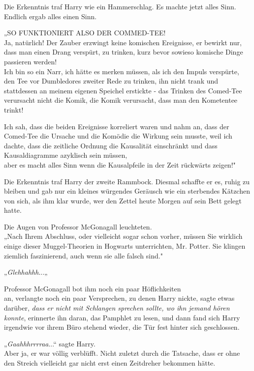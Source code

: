 {Die Erkenntnis traf Harry wie ein Hammerschlag. Es machte jetzt alles Sinn.\\ Endlich ergab alles einen Sinn.

„SO FUNKTIONIERT ALSO DER COMMED-TEE!\\ Ja, natürlich! Der Zauber erzwingt keine komischen Ereignisse, er bewirkt nur, dass man einen Drang verspürt, zu trinken, kurz bevor sowieso komische Dinge passieren werden!\\ Ich bin so ein Narr, ich hätte es merken müssen, als ich den Impuls verspürte, den Tee vor Dumbledores zweiter Rede zu trinken, ihn nicht trank und stattdessen an meinem eigenen Speichel erstickte - das Trinken des Comed-Tee verursacht nicht die Komik, die Komik verursacht, dass man den Kometentee trinkt!

Ich sah, dass die beiden Ereignisse korreliert waren und nahm an, dass der Comed-Tee die Ursache und die Komödie die Wirkung sein musste, weil ich dachte, dass die zeitliche Ordnung die Kausalität einschränkt und dass Kausaldiagramme azyklisch sein müssen,\\ aber es macht alles Sinn wenn die Kausalpfeile in der Zeit rückwärts zeigen!"

Die Erkenntnis traf Harry der zweite Rammbock. Diesmal schaffte er es, ruhig zu bleiben und gab nur ein kleines würgendes Geräusch wie ein sterbendes Kätzchen von sich, als ihm klar wurde, wer den Zettel heute Morgen auf sein Bett gelegt hatte.

Die Augen von Professor McGonagall leuchteten.\\ „Nach Ihrem Abschluss, oder vielleicht sogar schon vorher, müssen Sie wirklich einige dieser Muggel-Theorien in Hogwarts unterrichten, Mr. Potter. Sie klingen ziemlich faszinierend, auch wenn sie alle falsch sind."

„\emph{Glehhahhh}...„

Professor McGonagall bot ihm noch ein paar Höflichkeiten\\ an, verlangte noch ein paar Versprechen, zu denen Harry nickte, sagte etwas darüber, \emph{dass er nicht mit Schlangen sprechen sollte, wo ihn jemand hören konnte}, erinnerte ihn daran, das Pamphlet zu lesen, und dann fand sich Harry irgendwie vor ihrem Büro stehend wieder, die Tür fest hinter sich geschlossen.

„\emph{Gaahhhrrrraa}...“ sagte Harry.\\ Aber ja, er war völlig verblüfft. Nicht zuletzt durch die Tatsache, dass er ohne den Streich vielleicht gar nicht erst einen Zeitdreher bekommen hätte.

}
